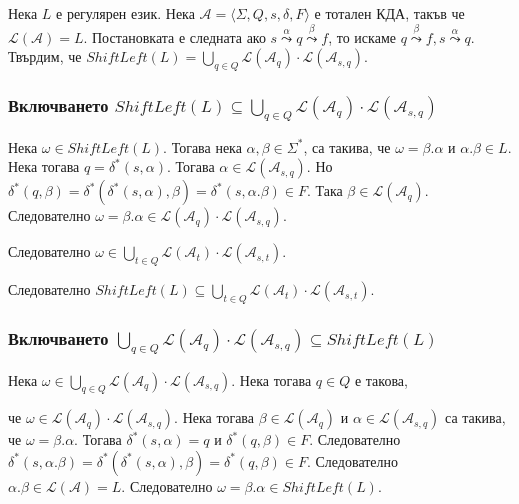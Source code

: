 \documentclass[12pt]{article}
\begin{document}
Нека \(L\) е регулярен език. Нека \(\mathcal{A} = \langle \Sigma, Q, s, \delta, F \rangle\) е тотален КДА, такъв че \(\mathcal{L}(\mathcal{A}) = L\).
Постановката е следната ако \(s \overset{\alpha}{\leadsto} q \overset{\beta}{\leadsto} f\), то искаме \(q \overset{\beta}{\leadsto} f, s \overset{\alpha}{\leadsto} q \). Твърдим, че \(ShiftLeft(L) = \displaystyle\bigcup_{q \in Q} \mathcal{L}(\mathcal{A}_q) \cdot \mathcal{L}(\mathcal{A}_{s, q}) \).

\subsubsection*{Включването \(ShiftLeft(L) \subseteq \displaystyle\bigcup_{q \in Q} \mathcal{L}(\mathcal{A}_q) \cdot \mathcal{L}(\mathcal{A}_{s, q})\)}

Нека \(\omega \in ShiftLeft(L)\). Тогава нека \(\alpha, \beta \in \Sigma^*\),
са такива, че \(\omega = \beta.\alpha\) и \(\alpha.\beta \in L\).
Нека тогава \(q = \delta^*(s, \alpha)\). Тогава \(\alpha \in \mathcal{L}(\mathcal{A}_{s, q})\).
Но \(\delta^*(q, \beta) = \delta^*(\delta^*(s, \alpha), \beta) = \delta^*(s, \alpha.\beta) \in F\).
Така \(\beta \in \mathcal{L}(\mathcal{A}_q)\). Следователно \(\omega = \beta.\alpha \in \mathcal{L}(\mathcal{A}_q) \cdot \mathcal{L}(\mathcal{A}_{s, q})\).

Следователно \(\omega \in \displaystyle\bigcup_{t \in Q} \mathcal{L}(\mathcal{A}_t) \cdot \mathcal{L}(\mathcal{A}_{s, t})\).

Следователно \(ShiftLeft(L) \subseteq \displaystyle\bigcup_{t \in Q} \mathcal{L}(\mathcal{A}_t) \cdot \mathcal{L}(\mathcal{A}_{s, t})\).

\subsubsection*{Включването \(\displaystyle\bigcup_{q \in Q} \mathcal{L}(\mathcal{A}_q) \cdot \mathcal{L}(\mathcal{A}_{s, q}) \subseteq ShiftLeft(L)\)}

Нека \(\omega \in \displaystyle\bigcup_{q \in Q} \mathcal{L}(\mathcal{A}_q) \cdot \mathcal{L}(\mathcal{A}_{s, q})\). Нека тогава \(q \in Q\) е такова,

че \(\omega \in \mathcal{L}(\mathcal{A}_q) \cdot \mathcal{L}(\mathcal{A}_{s, q})\).
Нека тогава \(\beta \in \mathcal{L}(\mathcal{A}_q)\) и \(\alpha \in \mathcal{L}(\mathcal{A}_{s, q})\)
са такива, че \(\omega = \beta.\alpha\). Тогава \(\delta^*(s, \alpha) = q\) и \(\delta^*(q, \beta) \in F\).
Следователно \(\delta^*(s, \alpha.\beta) = \delta^*(\delta^*(s, \alpha), \beta) = \delta^*(q, \beta) \in F\). Следователно \(\alpha.\beta \in \mathcal{L}(\mathcal{A}) = L\).
Следователно \(\omega = \beta.\alpha \in ShiftLeft(L)\).
\end{document}
